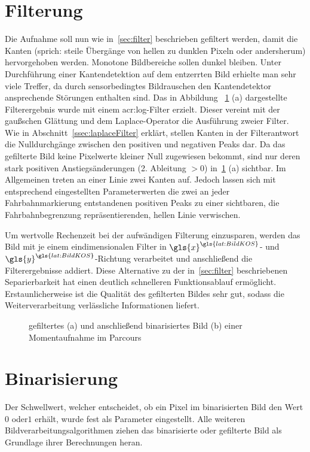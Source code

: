 \section{Filterung}
\label{sec:bildvorverarbeitung:filterung}
Die Aufnahme soll nun wie in~\ref{sec:filter} beschrieben gefiltert werden, damit die Kanten (sprich: steile Übergänge von hellen zu dunklen Pixeln oder andersherum) hervorgehoben werden. Monotone Bildbereiche sollen dunkel bleiben. Unter Durchführung einer Kantendetektion auf dem entzerrten Bild erhielte man sehr viele Treffer, da durch sensorbedingtes Bildrauschen den Kantendetektor ansprechende Störungen enthalten sind. Das in Abbildung ~\ref{fig:bildvorverarbeitung_filtern} (a) dargestellte Filterergebnis wurde mit einem \gls{acr:log}-Filter erzielt. Dieser vereint mit der gaußschen Glättung und dem Laplace-Operator die Ausführung zweier Filter. Wie in Abschnitt~\ref{ssec:laplaceFilter} erklärt, stellen Kanten in der Filterantwort die Nulldurchgänge zwischen den positiven und negativen Peaks dar. Da das gefilterte Bild keine Pixelwerte kleiner Null zugewiesen bekommt, sind nur deren stark positiven Anstiegsänderungen (2. Ableitung \( > 0\)) in~\ref{fig:bildvorverarbeitung_filtern} (a) sichtbar. Im Allgemeinen treten an einer Linie zwei Kanten auf. Jedoch lassen sich mit entsprechend eingestellten Parameterwerten die zwei an jeder Fahrbahnmarkierung entstandenen positiven Peaks zu einer sichtbaren, die Fahrbahnbegrenzung repräsentierenden, hellen Linie verwischen. 

Um wertvolle Rechenzeit bei der aufwändigen Filterung einzusparen, werden das Bild mit je einem eindimensionalen Filter in \( {\gls{x}}^{\gls{lat:BildKOS}} \)- und \( {\gls{y}}^{\gls{lat:BildKOS}} \)-Richtung verarbeitet und anschließend die Filterergebnisse addiert. Diese Alternative zu der in~\ref{sec:filter} beschriebenen Separierbarkeit hat einen deutlich schnelleren Funktionsablauf ermöglicht. Erstaunlicherweise ist die Qualität des gefilterten Bildes sehr gut, sodass die Weiterverarbeitung verlässliche Informationen liefert.


\begin{figure}[H] %
  \centering
  \qquad
  \caption{gefiltertes (a) und anschließend binarisiertes Bild (b) einer Momentaufnahme im Parcours}
\label{fig:bildvorverarbeitung_filtern}
\end{figure} 

\section{Binarisierung}

Der Schwellwert, welcher entscheidet, ob ein Pixel im binarisierten Bild den Wert \glqq \(0\)\grqq{} oder\glqq \(1\)\grqq{} erhält, wurde fest als Parameter eingestellt. Alle weiteren Bildverarbeitungsalgorithmen ziehen das binarisierte oder gefilterte Bild als Grundlage ihrer Berechnungen heran.